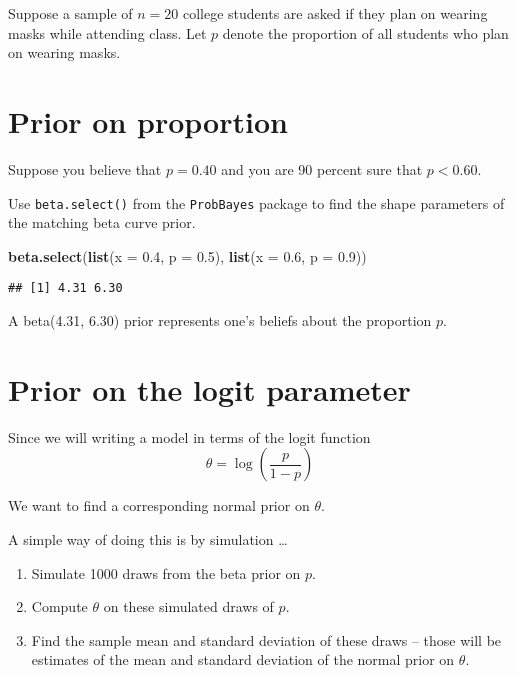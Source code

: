 \documentclass[
]{book}
\newenvironment{Shaded}{\begin{snugshade}}{\end{snugshade}}
\newcommand{\DataTypeTok}[1]{\textcolor[rgb]{0.13,0.29,0.53}{#1}}
\newcommand{\FloatTok}[1]{\textcolor[rgb]{0.00,0.00,0.81}{#1}}
\newcommand{\KeywordTok}[1]{\textcolor[rgb]{0.13,0.29,0.53}{\textbf{#1}}}
\newcommand{\NormalTok}[1]{#1}
\providecommand{\tightlist}{%
  \setlength{\itemsep}{0pt}\setlength{\parskip}{0pt}}
\begin{document}
Suppose a sample of \(n = 20\) college students are asked if they plan on wearing masks while attending class. Let \(p\) denote the proportion of all students who plan on wearing masks.

\hypertarget{prior-on-proportion}{%
\section{Prior on proportion}\label{prior-on-proportion}}

Suppose you believe that \(p = 0.40\) and you are 90 percent sure that \(p < 0.60\).

Use \texttt{beta.select()} from the \texttt{ProbBayes} package to find the shape parameters of the matching beta curve prior.

\begin{Shaded}
\begin{Highlighting}[]
\KeywordTok{beta.select}\NormalTok{(}\KeywordTok{list}\NormalTok{(}\DataTypeTok{x =} \FloatTok{0.4}\NormalTok{, }\DataTypeTok{p =} \FloatTok{0.5}\NormalTok{),}
            \KeywordTok{list}\NormalTok{(}\DataTypeTok{x =} \FloatTok{0.6}\NormalTok{, }\DataTypeTok{p =} \FloatTok{0.9}\NormalTok{))}
\end{Highlighting}
\end{Shaded}

\begin{verbatim}
## [1] 4.31 6.30
\end{verbatim}

A beta(4.31, 6.30) prior represents one's beliefs about the proportion \(p\).

\hypertarget{prior-on-the-logit-parameter}{%
\section{Prior on the logit parameter}\label{prior-on-the-logit-parameter}}

Since we will writing a model in terms of the logit function
\[
\theta = \log \left(\frac{p}{1-p}\right)
\]

We want to find a corresponding normal prior on \(\theta\).

A simple way of doing this is by simulation \ldots{}

\begin{enumerate}
\def\labelenumi{\arabic{enumi}.}
\tightlist
\item
  Simulate 1000 draws from the beta prior on \(p\).
\item
  Compute \(\theta\) on these simulated draws of \(p\).
\item
  Find the sample mean and standard deviation of these draws -- those will be estimates of the mean and standard deviation of the normal prior on \(\theta\).
\end{enumerate}
\end{document}
